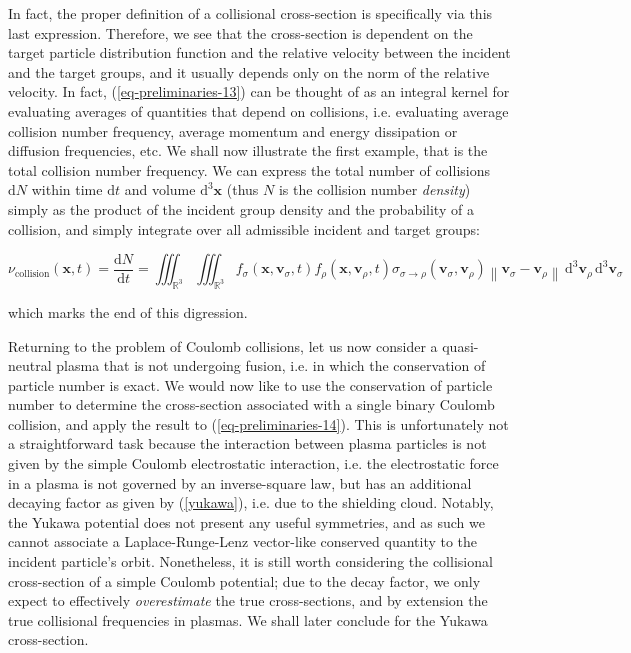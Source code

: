 In fact, the proper definition of a collisional cross-section is specifically via this last expression. Therefore, we see that the cross-section is dependent on the target particle distribution function and the relative velocity between the incident and the target groups, and it usually depends only on the norm of the relative velocity. In fact, (\ref{eq-preliminaries-13}) can be thought of as an integral kernel for evaluating averages of quantities that depend on collisions, i.e. evaluating average collision number frequency, average momentum and energy dissipation or diffusion frequencies, etc. We shall now illustrate the first example, that is the total collision number frequency. We can express the total number of collisions $\mathrm{d}N$ within time $\mathrm{d}t$ and volume $\mathrm{d^3}\mathbf{x}$ (thus $N$ is the collision number \textit{density}) simply as the product of the incident group density and the probability of a collision, and simply integrate over all admissible incident and target groups:

\begin{equation}
    \label{eq-preliminaries-14}
    \nu_{\mathrm{collision}}(\mathbf{x},t)=\frac{\mathrm{d}N}{\mathrm{d}t}=\iiint_{\mathbb{R}^3}\iiint_{\mathbb{R}^3}f_\sigma(\mathbf{x},\mathbf{v}_\sigma,t)f_\rho(\mathbf{x},\mathbf{v}_\rho,t)\sigma_{\sigma\to\rho}(\mathbf{v}_\sigma,\mathbf{v}_\rho)\left\|\mathbf{v}_\sigma-\mathbf{v}_\rho\right\|\,\mathrm{d^3}\mathbf{v}_\rho\,\mathrm{d^3}\mathbf{v}_\sigma
\end{equation}

which marks the end of this digression.

\vspace*{2.5pt}

\quad Returning to the problem of Coulomb collisions, let us now consider a quasi-neutral plasma that is not undergoing fusion, i.e. in which the conservation of particle number is exact. We would now like to use the conservation of particle number to determine the cross-section associated with a single binary Coulomb collision, and apply the result to (\ref{eq-preliminaries-14}). This is unfortunately not a straightforward task because the interaction between plasma particles is not given by the simple Coulomb electrostatic interaction, i.e. the electrostatic force in a plasma is not governed by an inverse-square law, but has an additional decaying factor as given by (\ref{yukawa}), i.e. due to the shielding cloud. Notably, the Yukawa potential does not present any useful symmetries, and as such we cannot associate a Laplace-Runge-Lenz vector-like conserved quantity to the incident particle's orbit. Nonetheless, it is still worth considering the collisional cross-section of a simple Coulomb potential; due to the decay factor, we only expect to effectively \textit{overestimate} the true cross-sections, and by extension the true collisional frequencies in plasmas. We shall later conclude for the Yukawa cross-section.

